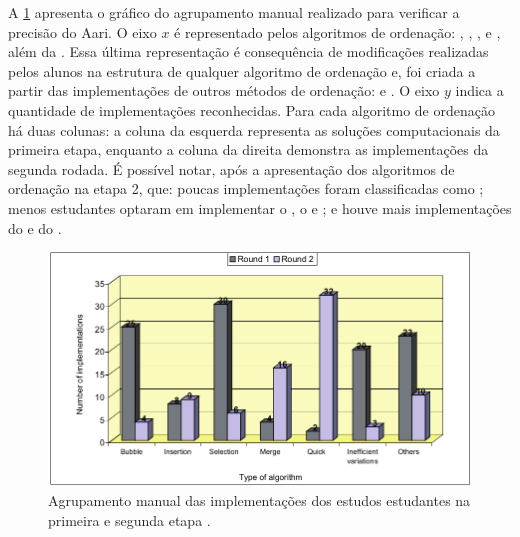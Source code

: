 		A \cref{fig:clusterManual} apresenta o gráfico do agrupamento manual
		realizado para verificar a precisão do Aari. O eixo $x$ é representado pelos
		algoritmos de ordenação: , ,
		,  e , além
		da . Essa última representação é consequência
		de modificações realizadas pelos alunos na estrutura de qualquer algoritmo de
		ordenação e,  foi criada a partir das implementações de outros
		métodos de ordenação:  e . O eixo $y$
		indica a quantidade de implementações reconhecidas. Para cada algoritmo de
		ordenação há duas colunas: a coluna da esquerda representa as soluções
		computacionais da primeira etapa, enquanto a coluna da direita demonstra as
		implementações da segunda rodada. É possível notar, após a apresentação dos
		algoritmos de ordenação na etapa 2, que: poucas implementações foram
		classificadas como ; menos estudantes optaram
		em implementar o , o  e
		; e houve mais implementações do  e do
		.
	    
	    \begin{figure}[h]
	        \centering
	        \includegraphics[scale=0.4]{imagem/clusterManual.png}
	        \captionsetup{justification=centering}
	        \caption{Agrupamento manual das implementações dos estudos estudantes na
	        primeira e segunda etapa \cite{Taherkhani:2012}.}
	        \label{fig:clusterManual}
	    \end{figure}
	    
